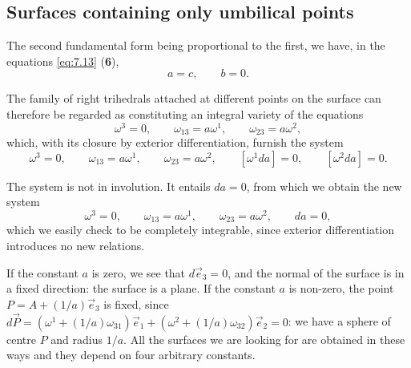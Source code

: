 \documentclass[leqno,11pt]{book}
\numberwithin{equation}{chapter}
\theoremstyle{shape1}
\theoremstyle{shape0}
\theoremstyle{shape2}
\theoremstyle{definition}
\begin{document}
\subsection{Surfaces containing only umbilical points}
\label{sec:surfaces-where-all}

\fsec The second fundamental form being proportional to the first, we have, in the equations \eqref{eq:7.13} (\textsection\textbf{6}),
\[
a=c,\qquad b=0.
\]

The family of right trihedrals attached at different points on the surface can therefore be regarded as constituting an integral variety of the equations
\[
\omega^{3}=0,\qquad \omega_{13}=a\omega^{1},\qquad \omega_{23}=a\omega^{2},
\]
which, with its closure by exterior differentiation, furnish the system
\[
\omega^{3}=0,\qquad \omega_{13}=a\omega^{1},\qquad \omega_{23}=a \omega^{2},\qquad [\omega^{1}da]=0,\qquad [\omega^{2}da]=0.
\]

The system is not in involution. It entails $da=0$, from which we obtain the new system
\begin{equation}
  \label{eq:7.I.1}
  \tag{I, 1}
  \omega^{3}=0,\qquad \omega_{13}= a\omega^{1},\qquad \omega_{23}=a\omega^{2},\qquad da=0,
\end{equation}
which we easily check to be completely integrable, since exterior differentiation introduces no new relations.

If the constant $a$ is zero, we see that $d\vec e_{3}=0$, and the normal of the surface is in a fixed direction: the surface is a plane. If the constant $a$ is non-zero, the point $P=A+(1/a)\vec e_{3}$ is fixed, since $d\vec P=(\omega^{1}+(1/a)\omega_{31})\vec e_{1}+(\omega^{2}+(1/a)\omega_{32})\vec e_{2}=0$: we have a sphere of centre $P$ and radius $1/a$. All the surfaces we are looking for are obtained in these ways and they depend on four arbitrary constants.
\end{document}

